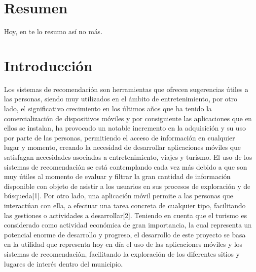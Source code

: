 \documentclass[12pt,letterpaper,openany]{book}
\begin{document}
\newpage
\listoffigures %

\newpage
\listoftables %

\chapter*{Resumen} %
Hoy, en te lo resumo así no más.

\chapter{Introducción}\label{cap.introduccion}
Los sistemas de recomendación son herramientas que ofrecen sugerencias útiles a las personas, siendo muy utilizados en el ámbito de entretenimiento, por otro lado, el significativo crecimiento en los últimos años que ha tenido la comercialización de dispositivos móviles y por consiguiente las aplicaciones que en ellos se instalan, ha provocado un notable incremento en la adquisición y su uso por parte de las personas, permitiendo el acceso de información en cualquier lugar y momento, creando la necesidad de desarrollar aplicaciones móviles que satisfagan necesidades asociadas a entretenimiento, viajes y turismo.
\vspace{5mm}\newline
El uso de los sistemas de recomendación se está contemplando cada vez más debido a que son muy útiles al momento de evaluar y filtrar la gran cantidad de información disponible con objeto de asistir a los usuarios en sus procesos de exploración y de búsqueda[1]. Por otro lado, una aplicación móvil permite a las personas que interactúan con ella, a efectuar una tarea concreta de cualquier tipo, facilitando las gestiones o actividades a desarrollar[2].
\vspace{5mm}\newline
Teniendo en cuenta que el turismo es considerado como actividad económica de gran importancia, la cual representa un potencial enorme de desarrollo y progreso, el desarrollo de este proyecto se basa en la utilidad que representa hoy en día el uso de las aplicaciones móviles y los sistemas de recomendación, facilitando la exploración de los diferentes sitios y lugares de interés dentro del municipio.
\end{document}
